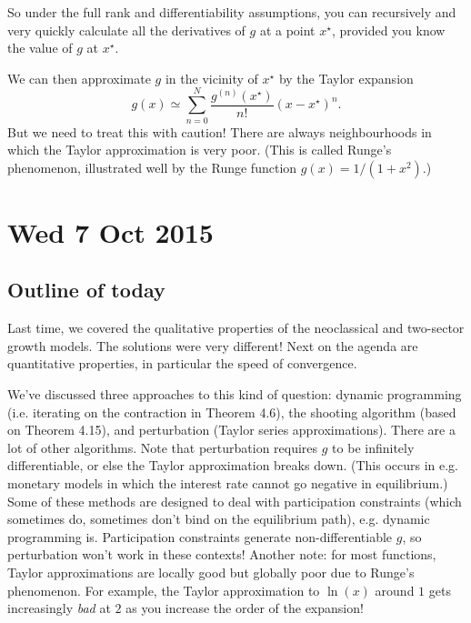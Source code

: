 \documentclass[11pt,letterpaper,reqno,oneside]{article}
\begin{document}
\begin{example}
	So under the full rank and differentiability assumptions, you can recursively and very quickly calculate all the derivatives of $g$ at a point $x^\star$, provided you know the value of $g$ at $x^\star$.

	We can then approximate $g$ in the vicinity of $x^\star$ by the Taylor expansion
	\begin{equation*}
		g(x) \simeq \sum_{n=0}^N \frac{g^{(n)}(x^\star)}{n!} (x - x^\star)^n . 
	\end{equation*}
	But we need to treat this with caution! There are always neighbourhoods in which the Taylor approximation is very poor. (This is called Runge's phenomenon, illustrated well by the Runge function $g(x) = 1/(1+x^2)$.)
\end{example}



\pagebreak
\section{Wed 7 Oct 2015}
\label{sec:07Oct2015}


\subsection{Outline of today}
\label{sec:07Oct2015:outline_of_last_time_today}

Last time, we covered the qualitative properties of the neoclassical and two-sector growth models. The solutions were very different! Next on the agenda are quantitative properties, in particular the speed of convergence.

We've discussed three approaches to this kind of question: dynamic programming (i.e. iterating on the contraction in Theorem 4.6), the shooting algorithm (based on Theorem 4.15), and perturbation (Taylor series approximations). There are a lot of other algorithms. Note that perturbation requires $g$ to be infinitely differentiable, or else the Taylor approximation breaks down. (This occurs in e.g. monetary models in which the interest rate cannot go negative in equilibrium.) Some of these methods are designed to deal with participation constraints (which sometimes do, sometimes don't bind on the equilibrium path), e.g. dynamic programming is. Participation constraints generate non-differentiable $g$, so perturbation won't work in these contexts! Another note: for most functions, Taylor approximations are locally good but globally poor due to Runge's phenomenon. For example, the Taylor approximation to $\ln (x)$ around $1$ gets increasingly \emph{bad} at $2$ as you increase the order of the expansion!
\end{document}
